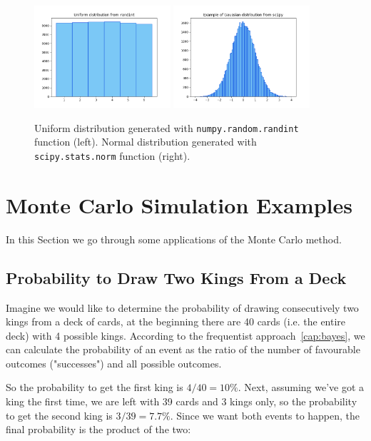 \begin{figure}
\centering
\includegraphics[width=0.45\textwidth]{figures/uniform}
\includegraphics[width=0.45\textwidth]{figures/standard_normal}
\caption{Uniform distribution generated with \texttt{numpy.random.randint} function (left). Normal distribution generated with \texttt{scipy.stats.norm} function (right).}
\label{fig:gauss_dist}
\end{figure}

\section{Monte Carlo Simulation Examples}
\label{example-of-monte-carlo-simulation}

In this Section we go through some applications of the Monte Carlo method.

\subsection{Probability to Draw Two Kings From a Deck}

Imagine we would like to determine the probability of drawing consecutively two kings from a deck of cards, at the beginning there are 40 cards (i.e. the entire deck) with 4 possible kings. According to the frequentist approach~\ref{cap:bayes}, we can calculate the probability of an event as the ratio of the number of favourable outcomes ("successes") and all possible outcomes. 

So the probability to get the first king is $4/40=10\%$. Next, assuming we've got a king the first time, we are left with 39 cards and 3 kings only, so the probability to get the second king is $3/39=7.7\%$. Since we want both events to happen, the final probability is the product of the two:

